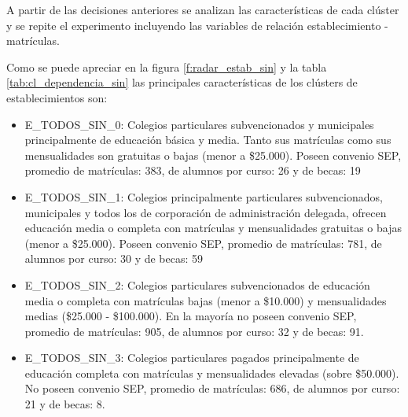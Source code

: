 A partir de las decisiones anteriores se analizan las características de cada clúster y se repite el experimento incluyendo las variables de relación establecimiento - matrículas.

Como se puede apreciar en la figura \ref{f:radar_estab_sin} y la tabla \ref{tab:cl_dependencia_sin} las principales características de los clústers de establecimientos son:

\begin{itemize}
    \item E\_TODOS\_SIN\_0: Colegios particulares subvencionados y municipales principalmente de educación básica y media. Tanto sus matrículas como sus mensualidades son gratuitas o bajas (menor a \$25.000). Poseen convenio SEP, promedio de matrículas: 383, de alumnos por curso: 26 y de becas: 19
    \item E\_TODOS\_SIN\_1: Colegios principalmente particulares subvencionados, municipales y todos los de corporación de administración delegada, ofrecen educación media o completa con matrículas y mensualidades gratuitas o bajas (menor a \$25.000). Poseen convenio SEP, promedio de matrículas: 781, de alumnos por curso: 30 y de becas: 59
    \item E\_TODOS\_SIN\_2: Colegios particulares subvencionados de educación media o completa con matrículas bajas (menor a \$10.000) y mensualidades medias (\$25.000 - \$100.000). En la mayoría no poseen convenio SEP, promedio de matrículas: 905, de alumnos por curso: 32 y de becas: 91.
    \item E\_TODOS\_SIN\_3: Colegios particulares pagados principalmente de educación completa con matrículas y mensualidades elevadas (sobre \$50.000). No poseen convenio SEP, promedio de matrículas: 686, de alumnos por curso: 21 y de becas: 8. 
\end{itemize}

